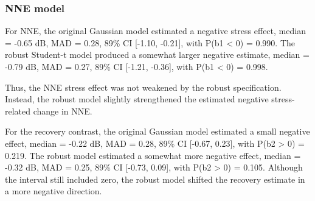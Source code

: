 \documentclass[
  english,
  man,floatsintext]{apa6}
\begin{document}
\subsubsection{NNE model}\label{nne-model}

For NNE, the original Gaussian model estimated a negative stress effect, median = -0.65 dB, MAD = 0.28, 89\% CI {[}-1.10, -0.21{]}, with P(b1 \textless{} 0) = 0.990. The robust Student-t model produced a somewhat larger negative estimate, median = -0.79 dB, MAD = 0.27, 89\% CI {[}-1.21, -0.36{]}, with P(b1 \textless{} 0) = 0.998.

Thus, the NNE stress effect was not weakened by the robust specification. Instead, the robust model slightly strengthened the estimated negative stress-related change in NNE.

For the recovery contrast, the original Gaussian model estimated a small negative effect, median = -0.22 dB, MAD = 0.28, 89\% CI {[}-0.67, 0.23{]}, with P(b2 \textgreater{} 0) = 0.219. The robust model estimated a somewhat more negative effect, median = -0.32 dB, MAD = 0.25, 89\% CI {[}-0.73, 0.09{]}, with P(b2 \textgreater{} 0) = 0.105. Although the interval still included zero, the robust model shifted the recovery estimate in a more negative direction.
\end{document}
